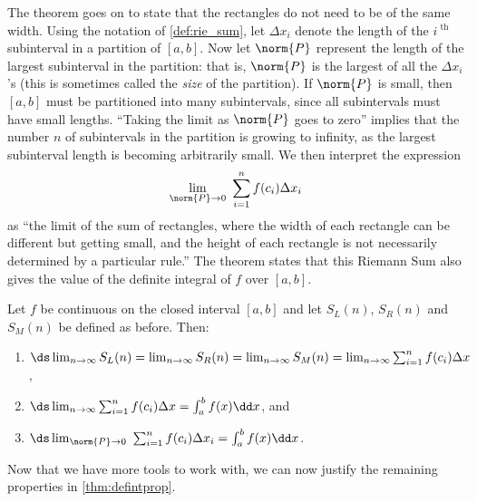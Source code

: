 The theorem goes on to state that the rectangles do not need to be of the same width. Using the notation of \autoref{def:rie_sum}, let $\Delta x_i$ denote the length of the $i^\text{ th}$ subinterval in a partition of $[a,b]$. Now let $\norm{P}$ represent the length of the largest subinterval in the partition: that is, $\norm{P}$ is the largest of all the $\Delta x_i$'s (this is sometimes called the \emph{size} of the partition). If $\norm{P}$ is small, then $[a,b]$ must be partitioned into many subintervals, since all subintervals must have small lengths. ``Taking the limit as $\norm{P}$ goes to zero'' implies that the number $n$ of subintervals in the partition is growing to infinity, as the largest subinterval length is becoming arbitrarily small. We then interpret the expression 
\[\lim_{\norm{P}\to 0}\ \sum_{i=1}^n f(c_i)\Delta x_i\]
as ``the limit of the sum of rectangles, where the width of each rectangle can be different but getting small, and the height of each rectangle is not necessarily determined by a particular rule.'' The theorem states that this Riemann Sum also gives the value of the definite integral of $f$ over $[a,b]$.

{
\begin{theorem}\label{thm:riemannSum}%
Let $f$ be continuous on the closed interval $[a,b]$  and let $S_L(n)$, $S_R(n)$ and $S_M(n)$ be defined as before. Then:
\begin{enumerate}
	\item	$\ds \lim_{n\to\infty} S_L(n) = \lim_{n\to\infty} S_R(n) = \lim_{n\to\infty} S_M(n) = \lim_{n\to\infty}\sum_{i=1}^n f(c_i)\Delta x$, 
	\item	$\ds \lim_{n\to\infty}\sum_{i=1}^n f(c_i)\Delta x = \int_a^b f(x)\dd x$, and
	\item	$\ds \lim_{\norm{P}\to 0}\ \sum_{i=1}^n f(c_i)\Delta x_i = \int_a^b f(x)\dd x$.
\end{enumerate}
\end{theorem}}

Now that we have more tools to work with, we can now justify the remaining properties in \autoref{thm:defintprop}. 

%

